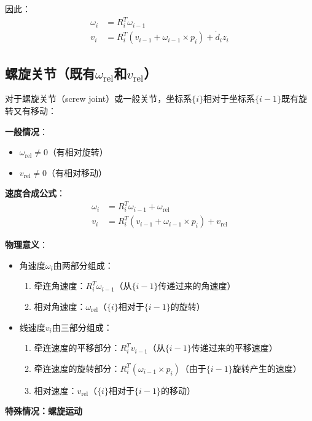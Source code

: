 \documentclass[12pt,a4paper]{article}
\begin{document}
因此：
\begin{align}
\omega_i &= R_i^T \omega_{i-1} \\
v_i &= R_i^T (v_{i-1} + \omega_{i-1} \times p_i) + \dot{d}_i z_i
\end{align}

\subsection{螺旋关节（既有$\omega_{\text{rel}}$和$v_{\text{rel}}$）}

对于螺旋关节（screw joint）或一般关节，坐标系$\{i\}$相对于坐标系$\{i-1\}$既有旋转又有移动：

\textbf{一般情况}：
\begin{itemize}
\item $\omega_{\text{rel}} \neq 0$（有相对旋转）
\item $v_{\text{rel}} \neq 0$（有相对移动）
\end{itemize}

\textbf{速度合成公式}：
\begin{align}
\omega_i &= R_i^T \omega_{i-1} + \omega_{\text{rel}} \tag{3} \\
v_i &= R_i^T (v_{i-1} + \omega_{i-1} \times p_i) + v_{\text{rel}} \tag{4}
\end{align}

\textbf{物理意义}：
\begin{itemize}
\item 角速度$\omega_i$由两部分组成：
\begin{enumerate}
\item 牵连角速度：$R_i^T \omega_{i-1}$（从$\{i-1\}$传递过来的角速度）
\item 相对角速度：$\omega_{\text{rel}}$（$\{i\}$相对于$\{i-1\}$的旋转）
\end{enumerate}

\item 线速度$v_i$由三部分组成：
\begin{enumerate}
\item 牵连速度的平移部分：$R_i^T v_{i-1}$（从$\{i-1\}$传递过来的平移速度）
\item 牵连速度的旋转部分：$R_i^T (\omega_{i-1} \times p_i)$（由于$\{i-1\}$旋转产生的速度）
\item 相对速度：$v_{\text{rel}}$（$\{i\}$相对于$\{i-1\}$的移动）
\end{enumerate}
\end{itemize}

\textbf{特殊情况：螺旋运动}
\end{document}

